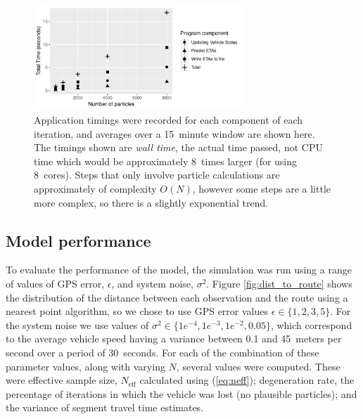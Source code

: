 \begin{figure}[tb]
    \centering
    \includegraphics[width=0.7\textwidth]{figures/04_model_results_timing.pdf}
    \caption{
        Application timings were recorded for each component of each
        iteration, and averages over a 15~minute window are shown here.
        The timings shown are \emph{wall time}, the actual time passed,
        not CPU time which would be approximately 8~times larger 
        (for using 8~cores).
        Steps that only involve particle calculations are approximately
        of complexity $O(N)$,
        however some steps are a little more complex, 
        so there is a slightly exponential trend.
    }
    \label{fig:timings}
\end{figure}




\subsection{Model performance}
\label{sec:model_perf}


To evaluate the performance of the model,
the simulation was run using a range of values of GPS error, $\epsilon$,
and system noise, $\sigma^2$.
Figure \ref{fig:dist_to_route} shows the distribution of the distance
between each observation and the route using a nearest point algorithm,
so we chose to use GPS error values $\epsilon \in \{1,2,3,5\}$. 
For the system noise we use values of $\sigma^2\in \{1e^{-4},1e^{-3},1e^{-2},0.05\}$,
which correspond to the average vehicle speed having a variance between 0.1 and 45~meters per second
over a period of 30~seconds.
For each of the combination of these parameter values, along with varying $N$,
several values were computed.
These were effective sample size, $N_\text{eff}$ calculated using (\ref{eq:neff});
degeneration rate, the percentage of iterations in which the vehicle was lost
(no plausible particles);
and the variance of segment travel time estimates.


